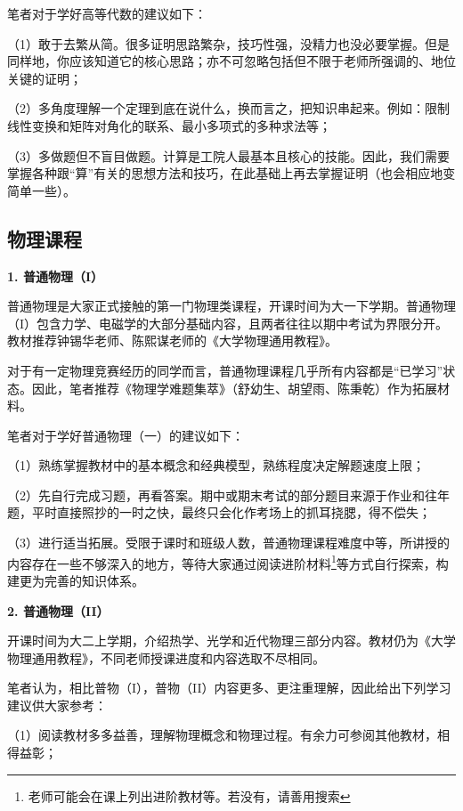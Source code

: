 \documentclass[11pt,oneside]{book}
\begin{document}
\vspace{10pt}

笔者对于学好高等代数的建议如下：

（1）敢于去繁从简。很多证明思路繁杂，技巧性强，没精力也没必要掌握。但是同样地，你应该知道它的核心思路；亦不可忽略包括但不限于老师所强调的、地位关键的证明；

（2）多角度理解一个定理到底在说什么，换而言之，把知识串起来。例如：限制线性变换和矩阵对角化的联系、最小多项式的多种求法等；

（3）多做题但不盲目做题。计算是工院人最基本且核心的技能。因此，我们需要掌握各种跟“算”有关的思想方法和技巧，在此基础上再去掌握证明（也会相应地变简单一些）。

\subsection{物理课程}
\textbf{1. 普通物理（I）}

普通物理是大家正式接触的第一门物理类课程，开课时间为大一下学期。普通物理（I）包含力学、电磁学的大部分基础内容，且两者往往以期中考试为界限分开。教材推荐钟锡华老师、陈熙谋老师的《大学物理通用教程》。

对于有一定物理竞赛经历的同学而言，普通物理课程几乎所有内容都是“已学习”状态。因此，笔者推荐《物理学难题集萃》（舒幼生、胡望雨、陈秉乾）作为拓展材料。

\vspace{10pt}

笔者对于学好普通物理（一）的建议如下：

（1）熟练掌握教材中的基本概念和经典模型，熟练程度决定解题速度上限；

（2）先自行完成习题，再看答案。期中或期末考试的部分题目来源于作业和往年题，平时直接照抄的一时之快，最终只会化作考场上的抓耳挠腮，得不偿失；

（3）进行适当拓展。受限于课时和班级人数，普通物理课程难度中等，所讲授的内容存在一些不够深入的地方，等待大家通过阅读进阶材料\footnote{老师可能会在课上列出进阶教材等。若没有，请善用搜索}等方式自行探索，构建更为完善的知识体系。

\vspace{10pt}

\textbf{2. 普通物理（II）}

开课时间为大二上学期，介绍热学、光学和近代物理三部分内容。教材仍为《大学物理通用教程》，不同老师授课进度和内容选取不尽相同。

笔者认为，相比普物（I），普物（II）内容更多、更注重理解，因此给出下列学习建议供大家参考：

（1）阅读教材多多益善，理解物理概念和物理过程。有余力可参阅其他教材，相得益彰；
\end{document}
